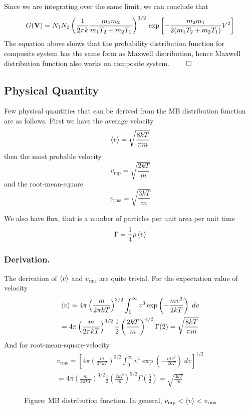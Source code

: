 \documentclass[../../../Main.tex]{subfiles}
\begin{document}
Since we are integrating over the same limit, we can conclude that 
\begin{equation*}
    G(\mathbf{V})= N_1 N_2 \left(\frac{1}{2\pi k}\frac{m_1m_2}{m_1T_2+ m_2T_1}\right)^{3/2}\\
    \exp \left[-\frac{m_2m_1}{2 (m_1T_2+ m_2T_1)} V^2\right] 
\end{equation*} 
The equation above shows that the probability distribution function for composite system has the same form as Maxwell distribution, hence Maxwell distribution function also works on composite system. $\qed$

\subsection*{Physical Quantity}
Few physical quantities that can be derived from the MB distribution function are as follows. First we have the average velocity
\begin{equation*}
    \braket{v}=\sqrt{\frac{8kT}{\pi m}}
\end{equation*}
then the most probable velocity 
\begin{equation*}
    v_\text{mp}=\sqrt{\frac{2kT}{m}}
\end{equation*}
and the root-mean-square 
\begin{equation*}
    v_\text{rms}=\sqrt{\frac{3kT}{m}}
\end{equation*}

We also have flux, that is a number of particles per unit area per unit time
\begin{equation*}
    \Gamma=\frac{1}{4}\rho\braket{v}
\end{equation*}

\subsubsection*{Derivation.} The derivation of $\braket{v}$ and $v_\text{rms}$ are quite trivial. For the expectation value of velocity
\begin{multline*}
    \braket{v}=4\pi \left(\frac{m}{2\pi k T}\right)^{3/2} \int_{0}^{\infty}v^3\exp\left(-\frac{m v^2}{2k T}\right)\;dv\\
    =4\pi \left(\frac{m}{2\pi k T}\right)^{3/2} \frac{1}{2}\left(\frac{2kT}{m}\right)^{4/2}\Gamma(2)=\sqrt{\frac{8kT}{\pi m}}
\end{multline*} 
And for root-mean-square-velocity
\begin{multline*}
    v_\text{rms}=\left[4\pi \left(\frac{m}{2\pi k T}\right)^{3/2} \int_{0}^{\infty}v^4\exp\left(-\frac{m v^2}{2k T}\right)\;dv\right]^{1/2}\\
    =4\pi \left(\frac{m}{2\pi k T}\right)^{3/2} \frac{1}{2}\left(\frac{2kT}{m}\right)^{5/2}\Gamma\left(\frac{5}{2}\right)=\sqrt{\frac{3kT}{m}}
\end{multline*} 
\begin{figure*}
    \centering
    \caption*{Figure: MB distribution function. In general, $v_\text{mp}<\braket{v}<v_\text{rms}$}
\end{figure*}
\end{document}

